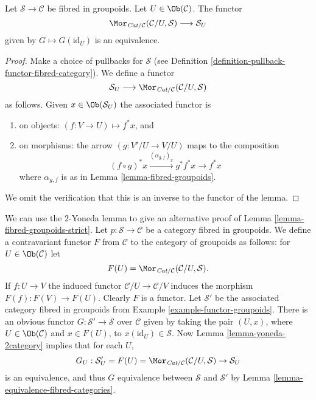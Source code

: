 \begin{lemma}
\label{lemma-yoneda-2category}
Let $\mathcal{S}\to \mathcal{C}$ be fibred in groupoids.
Let $U \in \Ob(\mathcal{C})$.
The functor
$$
\Mor_{\textit{Cat}/\mathcal{C}}(\mathcal{C}/U, \mathcal{S})
\longrightarrow
\mathcal{S}_U
$$
given by $G \mapsto G(\text{id}_U)$ is an equivalence.
\end{lemma}

\begin{proof}
Make a choice of pullbacks for $\mathcal{S}$
(see Definition \ref{definition-pullback-functor-fibred-category}).
We define a functor
$$
\mathcal{S}_U
\longrightarrow
\Mor_{\textit{Cat}/\mathcal{C}}(\mathcal{C}/U, \mathcal{S})
$$
as follows. Given
$x \in \Ob(\mathcal{S}_U)$
the associated functor is
\begin{enumerate}
\item on objects: $(f : V \to U) \mapsto f^*x$, and
\item on morphisms: the arrow $(g : V'/U \to V/U)$ maps to
the composition
$$
(f \circ g)^*x \xrightarrow{(\alpha_{g, f})_x} g^*f^*x \rightarrow f^*x
$$
where $\alpha_{g, f}$ is as in Lemma \ref{lemma-fibred-groupoids}.
\end{enumerate}
We omit the verification that this is an inverse to the functor
of the lemma.
\end{proof}

\begin{remark}
\label{remark-alternative-fibred-groupoids-strict}
We can use the $2$-Yoneda lemma to give an alternative proof of
Lemma \ref{lemma-fibred-groupoids-strict}.
Let $p : \mathcal{S} \to \mathcal{C}$ be a category fibred in groupoids.
We define a contravariant functor $F$ from $\mathcal{C}$ to the
category of groupoids as follows: for $U\in \Ob(\mathcal{C})$
let
$$
F(U) = \Mor_{\textit{Cat}/\mathcal{C}}(\mathcal{C}/U, \mathcal{S}).
$$
If $f : U \to V$ the induced functor $\mathcal{C}/U \to \mathcal{C}/V$
induces the morphism $F(f) : F(V) \to F(U)$. Clearly $F$ is a functor.
Let $\mathcal{S}'$ be the associated category fibred in groupoids from
Example \ref{example-functor-groupoids}.
There is an obvious functor $G : \mathcal{S}' \to \mathcal{S}$
over $\mathcal{C}$ given by taking the pair $(U, x)$, where
$U \in \Ob(\mathcal{C})$ and $x \in F(U)$, to
$x(\text{id}_U) \in \mathcal{S}$.  Now
Lemma \ref{lemma-yoneda-2category}
implies that for each $U$,
$$
G_U : \mathcal{S}'_U = F(U)=
\Mor_{\textit{Cat}/\mathcal{C}}(\mathcal{C}/U, \mathcal{S})
\to
\mathcal{S}_U
$$
is an equivalence, and thus $G$ equivalence between $\mathcal{S}$ and
$\mathcal{S}'$ by Lemma \ref{lemma-equivalence-fibred-categories}.
\end{remark}

